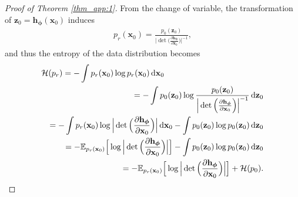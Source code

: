 \documentclass{article}
\theoremstyle{definition}
\theoremstyle{remark}
\newcommand*\diff{\mathop{}\!\mathrm{d}}
\begin{document}
	\begin{proof}[Proof of Theorem \ref{thm_app:1}]
		From the change of variable, the transformation of $\mathbf{z}_{0}=\mathbf{h}_{\bm{\phi}}(\mathbf{x}_{0})$ induces
		\begin{align*}
		p_{r}(\mathbf{x}_{0})=\frac{p_{0}(\mathbf{z}_{0})}{\Big\vert\det\Big(\frac{\partial\mathbf{h}_{\bm{\phi}}}{\partial\mathbf{x}_{0}}\Big)\Big\vert^{-1}},
		\end{align*}
		and thus the entropy of the data distribution becomes
		\begin{eqnarray*}
			\lefteqn{\mathcal{H}(p_{r})=-\int p_{r}(\mathbf{x}_{0})\log{p_{r}(\mathbf{x}_{0})}\diff\mathbf{x}_{0}}\\
			&&=-\int p_{0}(\mathbf{z}_{0})\log{\frac{p_{0}(\mathbf{z}_{0})}{\Big\vert\det\Big(\frac{\partial\mathbf{h}_{\bm{\phi}}}{\partial\mathbf{x}_{0}}\Big)\Big\vert^{-1}}}\diff\mathbf{z}_{0}\\
			&&=-\int p_{r}(\mathbf{x}_{0})\log{\Big\vert\det\Big(\frac{\partial\mathbf{h}_{\bm{\phi}}}{\partial\mathbf{x}_{0}}\Big)\Big\vert}\diff\mathbf{x}_{0}-\int p_{0}(\mathbf{z}_{0})\log{p_{0}(\mathbf{z}_{0})}\diff\mathbf{z}_{0}\\
			&&=-\mathbb{E}_{p_{r}(\mathbf{x}_{0})}\Big[\log{\Big\vert\det\Big(\frac{\partial\mathbf{h}_{\bm{\phi}}}{\partial\mathbf{x}_{0}}\Big)\Big\vert}\Big]-\int p_{0}(\mathbf{z}_{0})\log{p_{0}(\mathbf{z}_{0})}\diff\mathbf{z}_{0}\\
			&&=-\mathbb{E}_{p_{r}(\mathbf{x}_{0})}\Big[\log{\Big\vert\det\Big(\frac{\partial\mathbf{h}_{\bm{\phi}}}{\partial\mathbf{x}_{0}}\Big)\Big\vert}\Big]+\mathcal{H}(p_{0}).
		\end{eqnarray*}
		

\end{proof}
\end{document}
